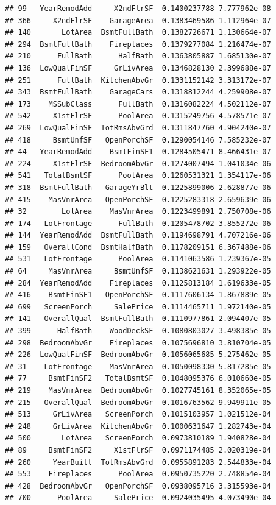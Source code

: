 \documentclass[american,]{article}
\theoremstyle{definition}
\theoremstyle{definition}
\theoremstyle{definition}
\theoremstyle{remark}
\begin{document}
\begin{verbatim}
## 99   YearRemodAdd     X2ndFlrSF  0.1400237788 7.777962e-08
## 366     X2ndFlrSF    GarageArea  0.1383469586 1.112964e-07
## 140       LotArea  BsmtFullBath  0.1382726671 1.130664e-07
## 294  BsmtFullBath    Fireplaces  0.1379277084 1.216474e-07
## 210      FullBath      HalfBath  0.1363805887 1.685130e-07
## 136  LowQualFinSF     GrLivArea  0.1346828130 2.399688e-07
## 251      FullBath  KitchenAbvGr  0.1331152142 3.313172e-07
## 343  BsmtFullBath    GarageCars  0.1318812244 4.259908e-07
## 173    MSSubClass      FullBath  0.1316082224 4.502112e-07
## 542     X1stFlrSF      PoolArea  0.1315249756 4.578571e-07
## 269  LowQualFinSF  TotRmsAbvGrd  0.1311847760 4.904240e-07
## 418     BsmtUnfSF   OpenPorchSF  0.1290054146 7.585232e-07
## 44   YearRemodAdd    BsmtFinSF1  0.1284505471 8.466431e-07
## 224     X1stFlrSF  BedroomAbvGr  0.1274007494 1.041034e-06
## 541   TotalBsmtSF      PoolArea  0.1260531321 1.354117e-06
## 318  BsmtFullBath   GarageYrBlt  0.1225899006 2.628877e-06
## 415    MasVnrArea   OpenPorchSF  0.1225283318 2.659639e-06
## 32        LotArea    MasVnrArea  0.1223499891 2.750708e-06
## 174   LotFrontage      FullBath  0.1205478702 3.855272e-06
## 144  YearRemodAdd  BsmtFullBath  0.1194698791 4.707216e-06
## 159   OverallCond  BsmtHalfBath  0.1178209151 6.367488e-06
## 531   LotFrontage      PoolArea  0.1141063586 1.239367e-05
## 64     MasVnrArea     BsmtUnfSF  0.1138621631 1.293922e-05
## 284  YearRemodAdd    Fireplaces  0.1125813184 1.619633e-05
## 416    BsmtFinSF1   OpenPorchSF  0.1117606134 1.867889e-05
## 699   ScreenPorch     SalePrice  0.1114465711 1.972140e-05
## 141   OverallQual  BsmtFullBath  0.1110977861 2.094407e-05
## 399      HalfBath    WoodDeckSF  0.1080803027 3.498385e-05
## 298  BedroomAbvGr    Fireplaces  0.1075696810 3.810704e-05
## 226  LowQualFinSF  BedroomAbvGr  0.1056065685 5.275462e-05
## 31    LotFrontage    MasVnrArea  0.1050098330 5.817285e-05
## 77     BsmtFinSF2   TotalBsmtSF  0.1048095376 6.010660e-05
## 219    MasVnrArea  BedroomAbvGr  0.1027745161 8.352065e-05
## 215   OverallQual  BedroomAbvGr  0.1016763562 9.949911e-05
## 513     GrLivArea   ScreenPorch  0.1015103957 1.021512e-04
## 248     GrLivArea  KitchenAbvGr  0.1000631647 1.282743e-04
## 500       LotArea   ScreenPorch  0.0973810189 1.940828e-04
## 89     BsmtFinSF2     X1stFlrSF  0.0971174485 2.020319e-04
## 260     YearBuilt  TotRmsAbvGrd  0.0955891283 2.544833e-04
## 553    Fireplaces      PoolArea  0.0950735220 2.748854e-04
## 428  BedroomAbvGr   OpenPorchSF  0.0938095716 3.315593e-04
## 700      PoolArea     SalePrice  0.0924035495 4.073490e-04

\end{verbatim}
\end{document}
